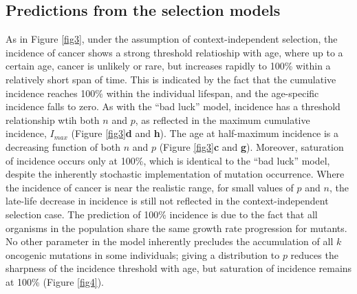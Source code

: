 \documentclass[12pt,onecolumn,twoside]{article}
\begin{document}
\subsection{Predictions from the selection models}
As in Figure \ref{fig3}, under the assumption of context-independent selection, the incidence of cancer shows a strong threshold relatioship with age, where up to a certain age, cancer is unlikely or rare, but increases rapidly to 100\% within a relatively short span of time. This is indicated by the fact that the cumulative incidence reaches 100\% within the individual lifespan, and the age-specific incidence falls to zero. As with the ``bad luck'' model, incidence has a threshold relationship wtih both $n$ and $p$, as reflected in the maximum cumulative incidence, $I_{max}$ (Figure \ref{fig3}\textbf{d} and \textbf{h}). The age at half-maximum incidence is a decreasing function of both $n$ and $p$ (Figure \ref{fig3}\textbf{c} and \textbf{g}). Moreover, saturation of incidence occurs only at 100\%, which is identical to the ``bad luck'' model, despite the inherently stochastic implementation of mutation occurrence. Where the incidence of cancer is near the realistic range, for small values of $p$ and $n$, the late-life decrease in incidence is still not reflected in the context-independent selection case. The prediction of 100\% incidence is due to the fact that all organisms in the population share the same growth rate progression for mutants. No other parameter in the model inherently precludes the accumulation of all $k$ oncogenic mutations in some individuals; giving a distribution to $p$ reduces the sharpness of the incidence threshold with age, but saturation of incidence remains at 100\% (Figure \ref{fig4}).
\end{document}
